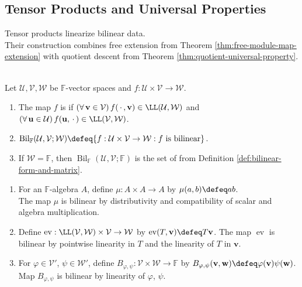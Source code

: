 \subsection{Tensor Products and Universal Properties}


Tensor products linearize bilinear data.\\
Their construction combines free extension from Theorem \ref{thm:free-module-map-extension} with quotient descent from Theorem \ref{thm:quotient-universal-property}.

\begin{definition} \label{def:bilinear-map} \\
Let $\mathcal{U},\mathcal{V},\mathcal{W}$ be $\mathbb{F}$-vector spaces and $f:\mathcal{U}\times\mathcal{V}\to\mathcal{W}$.
\begin{enumerate}[label=(\roman*)]
\setlength{\itemsep}{0pt}
\item The map $f$ is  if $(\forall\,\mathbf{v}\in\mathcal{V})\,f(\,\cdot\,,\mathbf{v})\in\LL(\mathcal{U},\mathcal{W})$ and $(\forall\,\mathbf{u}\in\mathcal{U})\,f(\mathbf{u},\,\cdot\,)\in\LL(\mathcal{V},\mathcal{W})$.
\item $\operatorname{Bil}_{\mathbb{F}}(\mathcal{U},\mathcal{V};\mathcal{W})\defeq\{f:\mathcal{U}\times\mathcal{V}\to\mathcal{W}:f\text{ is bilinear}\}$.
\item If $\mathcal{W}=\mathbb{F}$, then $\operatorname{Bil}_{\mathbb{F}}(\mathcal{U},\mathcal{V};\mathbb{F})$ is the set of  from Definition \ref{def:bilinear-form-and-matrix}.
\end{enumerate}
\end{definition}

\begin{example} \label{ex:basic-bilinear-maps} 
\begin{enumerate}[label=(\roman*)]
\setlength{\itemsep}{0pt}
\item For an $\mathbb{F}$-algebra $A$, define $\mu:A\times A\to A$ by $\mu(a,b)\defeq ab$.\\
The map $\mu$ is bilinear by distributivity and compatibility of scalar and algebra multiplication.
\item Define $\operatorname{ev}:\LL(\mathcal{V},\mathcal{W})\times\mathcal{V}\to\mathcal{W}$ by $\operatorname{ev}(T,\mathbf{v})\defeq T\mathbf{v}$. The map $\operatorname{ev}$ is bilinear by pointwise linearity in $T$ and the linearity of $T$ in $\mathbf{v}$.
\item For $\varphi\in\mathcal{V}'$, $\psi\in\mathcal{W}'$, define $B_{\varphi,\psi}:\mathcal{V}\times\mathcal{W}\to\mathbb{F}$ by $B_{\varphi,\psi}(\mathbf{v},\mathbf{w})\defeq\varphi(\mathbf{v})\psi(\mathbf{w})$. Map $B_{\varphi,\psi}$ is bilinear by linearity of $\varphi$, $\psi$.
\end{enumerate}
\end{example}

